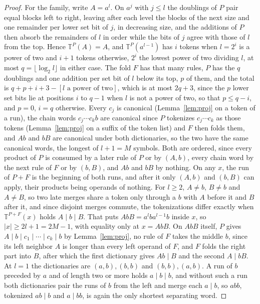 \documentclass[11pt,a4paper]{article}
\theoremstyle{definition}
\theoremstyle{plain}
\newcommand{\T}{\mathbb{T}}
\begin{document}
\begin{proof}
For the family, write \(A = a^l\). On \(a^j\) with \(j \le l\) the doublings of \(P\) pair equal blocks left to right,
leaving after each level the blocks of the next size and one remainder per lower set bit of \(j\), in decreasing size,
and the additions of \(P\) then absorb the remainders of \(l\) in order while the bits of \(j\) agree with those of
\(l\) from the top. Hence \(\T^P(A) = A\), and \(\T^P(a^{l-1})\) has \(i\) tokens when \(l = 2^i\) is a power of two and
\(i + 1\) tokens otherwise, \(2^i\) the lowest power of two dividing \(l\), at most \(q = \lfloor \log_2 l \rfloor\) in
either case. The fold \(F\) has that many rules, \(P\) has the \(q\) doublings and one addition per set bit of \(l\)
below its top, \(p\) of them, and the total is \(q + p + i + 3 - [l \text{ a power of two}]\), which is at most
\(2q + 3\), since the \(p\) lower set bits lie at positions \(i\) to \(q - 1\) when \(l\) is not a power of two, so that
\(p \le q - i\), and \(p = 0\), \(i = q\) otherwise. Every \(c_j\) is canonical (Lemma~\ref{lem:proj} on a token of a
run), the chain words \(c_j \cdots c_k b\) are canonical since \(P\) tokenizes \(c_j \cdots c_k\) as those tokens
(Lemma~\ref{lem:proj} on a suffix of the token list) and \(F\) then folds them, and \(Ab\) and \(bB\) are canonical
under both dictionaries, so the two have the same canonical words, the longest of \(l + 1 = M\) symbols. Both are
ordered, since every product of \(P\) is consumed by a later rule of \(P\) or by \((A, b)\), every chain word by the
next rule of \(F\) or by \((b, B)\), and \(Ab\) and \(bB\) by nothing. On any \(x\), the run of \(P + F\) is the
beginning of both runs, and after it only \((A, b)\) and \((b, B)\) can apply, their products being operands of nothing.
For \(l \ge 2\), \(A \ne b\), \(B \ne b\) and \(A \ne B\), so two late merges share a token only through a \(b\) with
\(A\) before it and \(B\) after it, and since disjoint merges commute, the tokenizations differ exactly when
\(\T^{P+F}(x)\) holds \(A \mid b \mid B\). That puts \(AbB = a^l b a^{l-1} b\) inside \(x\), so
\(|x| \ge 2l + 1 = 2M - 1\), with equality only at \(x = AbB\). On \(AbB\) itself, \(P\) gives
\(A \mid b \mid c_1 \mid \cdots \mid c_k \mid b\) by Lemma~\ref{lem:proj}, no rule of \(F\) takes the middle \(b\),
since its left neighbor \(A\) is longer than every left operand of \(F\), and \(F\) folds the right part into \(B\),
after which the first dictionary gives \(Ab \mid B\) and the second \(A \mid bB\). At \(l = 1\) the dictionaries are
\((a, b), (b, b)\) and \((b, b), (a, b)\). A run of \(b\) preceded by \(a\) and of length two or more holds
\(a \mid b \mid b\), and without such a run both dictionaries pair the runs of \(b\) from the left and merge each
\(a \mid b\), so \(abb\), tokenized \(ab \mid b\) and \(a \mid bb\), is again the only shortest separating word.
\end{proof}
\end{document}
